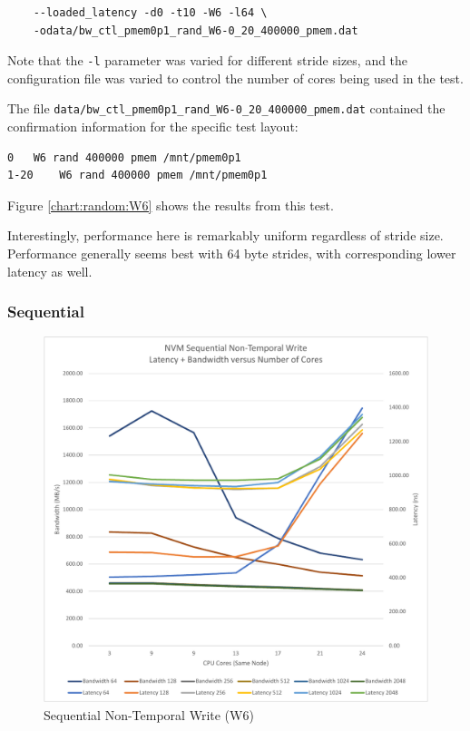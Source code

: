 \begin{verbatim}
    --loaded_latency -d0 -t10 -W6 -l64 \
    -odata/bw_ctl_pmem0p1_rand_W6-0_20_400000_pmem.dat
\end{verbatim}

Note that the \verb+-l+ parameter was varied for different
stride sizes, and the configuration file was varied to control
the number of cores being used in the test.

The file \verb+data/bw_ctl_pmem0p1_rand_W6-0_20_400000_pmem.dat+ contained the confirmation information
for the specific test layout:

\begin{verbatim}
0	W6 rand 400000 pmem /mnt/pmem0p1
1-20	W6 rand 400000 pmem /mnt/pmem0p1
\end{verbatim}

Figure \ref{chart:random:W6} shows the results from this test.

Interestingly, performance here is remarkably uniform regardless
of stride size.  Performance generally seems best with 64 byte
strides, with corresponding lower latency as well.


\subsubsection{Sequential}

\begin{figure}
    \centering
    \caption{Sequential Non-Temporal Write (W6)}\label{chart:sequential:W6}
    \includegraphics[scale=0.5]{charts/sequential-w6-crop.pdf}
\end{figure}

